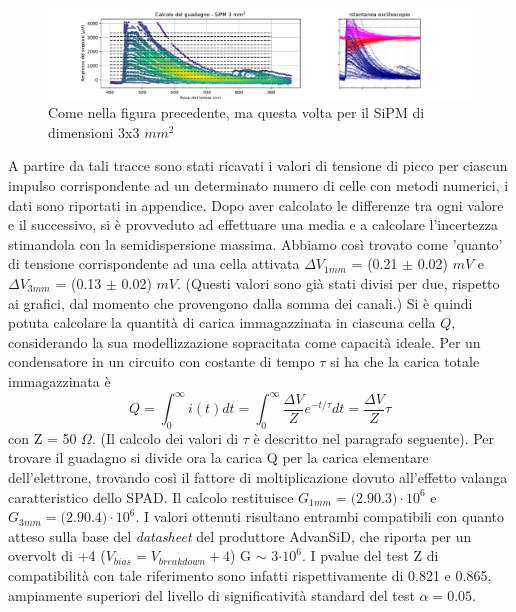 \documentclass[journal]{IEEEtran}
\begin{document}
\begin{figure}[t]%
\centering
\begin{center}
\includegraphics[trim = {100pt 0 0 0}, width=1.15\textwidth]{analysis/output/SiPM_3mm_gain_staircase.pdf}
\end{center}
\caption{Come nella figura precedente, ma questa volta per il SiPM di dimensioni 3x3 $mm^2$}
\label{fig:staircase_3mm}
\end{figure}

A partire da tali tracce sono stati ricavati i valori di tensione di picco per ciascun impulso corrispondente ad un determinato numero di celle con metodi numerici, i dati sono riportati in appendice. Dopo aver calcolato le differenze tra ogni valore e il successivo, si è provveduto ad effettuare una media e a calcolare l'incertezza stimandola con la semidispersione massima. Abbiamo così trovato come 'quanto' di tensione corrispondente ad una cella attivata $\Delta V_{1mm}$ = (0.21 $\pm$ 0.02) $mV$ e  $\Delta V_{3mm}$ = (0.13 $\pm$ 0.02) $mV$. (Questi valori sono già stati divisi per due, rispetto ai grafici, dal momento che provengono dalla somma dei canali.) Si è quindi potuta calcolare la quantità di carica immagazzinata in ciascuna cella $Q$, considerando la sua modellizzazione sopracitata come capacità ideale. Per un condensatore in un circuito con costante di tempo $\tau$ si ha che la carica totale immagazzinata è
\begin{equation}
    Q = \int_{0}^{\infty} i(t) dt = \int_{0}^{\infty} \frac{\Delta V}{Z} e^{-t/ \tau}  dt = \frac{\Delta V}{Z} \tau
\end{equation}
con Z = 50 $\Omega$. (Il calcolo dei valori di $\tau$ è descritto nel paragrafo seguente). Per trovare il guadagno si divide ora la carica Q per la carica elementare dell'elettrone, trovando così il fattore di moltiplicazione dovuto all'effetto valanga caratteristico dello SPAD. Il calcolo restituisce $G_{1mm} = (2.9 $\pm$ 0.3)\cdot 10^6$ e $G_{3mm} = (2.9 $\pm$ 0.4)\cdot 10^6$. I valori ottenuti risultano entrambi compatibili con quanto atteso sulla base del \textit{datasheet} del produttore AdvanSiD, che riporta per un overvolt di +4 ($V_{bias} = V_{breakdown} + 4$) G $\sim$ 3$\cdot10^6$. I pvalue del test Z di compatibilità con tale riferimento sono infatti rispettivamente di 0.821 e 0.865, ampiamente superiori del livello di significatività standard del test $\alpha = 0.05$.
\end{document}
